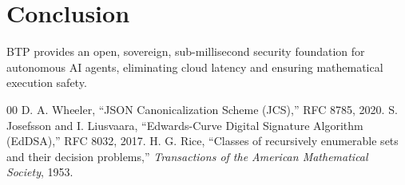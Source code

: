 \documentclass[conference]{IEEEtran}
\begin{document}
\section{Conclusion}
BTP provides an open, sovereign, sub-millisecond security foundation for autonomous AI agents, eliminating cloud latency and ensuring mathematical execution safety.

\begin{thebibliography}{00}
 D. A. Wheeler, ``JSON Canonicalization Scheme (JCS),'' RFC 8785, 2020.
 S. Josefsson and I. Liusvaara, ``Edwards-Curve Digital Signature Algorithm (EdDSA),'' RFC 8032, 2017.
 H. G. Rice, ``Classes of recursively enumerable sets and their decision problems,'' \textit{Transactions of the American Mathematical Society}, 1953.
\end{thebibliography}
\end{document}
